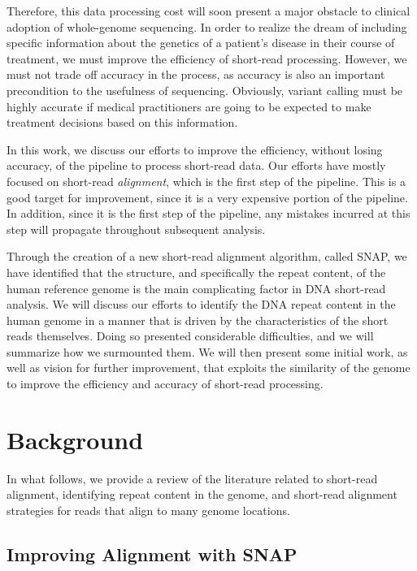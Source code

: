 \documentclass[twocolumn,10pt]{article}
\begin{document}
Therefore, this data processing cost will soon present a major obstacle to clinical adoption of whole-genome sequencing.  In order to realize the dream of including specific information about the genetics of a patient's disease in their course of treatment, we must improve the efficiency of short-read processing.  However, we must not trade off accuracy in the process, as accuracy is also an important precondition to the usefulness of sequencing.  Obviously, variant calling must be highly accurate if medical practitioners are going to be expected to make treatment decisions based on this information.

In this work, we discuss our efforts to improve the efficiency, without losing accuracy, of the pipeline to process short-read data.  Our efforts have mostly focused on short-read \textit{alignment}, which is the first step of the pipeline.  This is a good target for improvement, since it is a very expensive portion of the pipeline.  In addition, since it is the first step of the pipeline, any mistakes incurred at this step will propagate throughout subsequent analysis.  

Through the creation of a new short-read alignment algorithm, called SNAP, we have identified that the structure, and specifically the repeat content, of the human reference genome is the main complicating factor in DNA short-read analysis.  We will discuss our efforts to identify the DNA repeat content in the human genome in a manner that is driven by the characteristics of the short reads themselves.  Doing so presented considerable difficulties, and we will summarize how we surmounted them.  We will then present some initial work, as well as vision for further improvement, that exploits the similarity of the genome to improve the efficiency and accuracy of short-read processing.

\section{Background}

In what follows, we provide a review of the literature related to short-read alignment, identifying repeat content in the genome, and short-read alignment strategies for reads that align to many genome locations.

\subsection{Improving Alignment with SNAP}
\label{section:SNAP}
\end{document}
